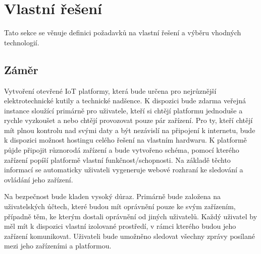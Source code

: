 \section{Vlastní řešení}
Tato sekce se věnuje definici požadavků na vlastní řešení a výběru vhodných technologií.

\subsection{Záměr}
Vytvoření otevřené IoT platformy, která bude určena pro nejrůznější elektrotechnické kutily a technické nadšence. K dispozici bude zdarma veřejná instance sloužící primárně pro uživatele, kteří si chtějí platformu jednoduše a rychle vyzkoušet a nebo chtějí provozovat pouze pár zařízení. Pro ty, kteří chtějí mít plnou kontrolu nad svými daty a být nezávislí na připojení k internetu, bude k dispozici možnost hostingu celého řešení na vlastním hardwaru. K platformě půjde připojit různorodá zařízení a bude vytvořeno schéma, pomocí kterého zařízení popíší platformě vlastní funkčnost/schopnosti. Na základě těchto informací se automaticky uživateli vygeneruje webové rozhraní ke sledování a ovládání jeho zařízení.

Na bezpečnost bude kladen vysoký důraz. Primárně bude založena na uživatelských účtech, které budou mít oprávnění pouze ke svým zařízením, případně těm, ke kterým dostali oprávnění od jiných uživatelů. Každý uživatel by měl mít k dispozici vlastní izolované prostředí, v rámci kterého budou jeho zařízení komunikovat. Uživateli bude umožněno sledovat všechny zprávy posílané mezi jeho zařízeními a platformou.


